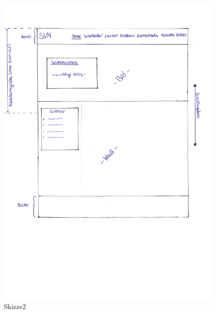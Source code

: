 \documentclass[12pt,a4paper]{article}
\begin{document}
\begin{figure}[!htbp]
	\includegraphics[scale=0.75]{Skizze02.pdf}
	\caption{Skizze2}
	\label{img:Skizze2}
\end{figure}
\newpage
\end{document}
